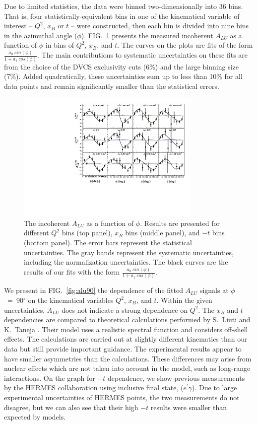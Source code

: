 \documentclass[twocolumn,nofootinbib,showpacs,prl,superscriptaddress,secnumarabic,amssymb,nobibnotes,aps,floatfix]{revtex4}
\begin{document}
Due to limited statistics, the data were binned two-dimensionally into 36 bins.  
That is, four statistically-equivalent bins in one of the kinematical 
variable of interest -- $Q^{2}$, $x_{B}$ or $t$ -- were constructed, then each 
bin is divided into nine bins in the azimuthal angle ($\phi$).  
FIG.~\ref{fig:alu} presents the measured incoherent $A_{LU}$ as a function of 
$\phi$ in bins of $Q^{2}$, $x_{B}$, and $t$. The curves on the plots are fits 
of the form $\frac{a_{0}~sin(\phi)}{1+ a_{1}~cos(\phi)}$. The main contributions 
to systematic uncertainties on these fits are from the choice of the DVCS 
exclusivity cuts (6\%) and the large binning size (7\%). Added quadratically, 
these uncertainties sum up to less than 10\% for all data points and remain 
significantly smaller than the statistical errors.

\begin{figure}[tb]
\includegraphics[width=8.9cm]{figs/incoherent_ALU_phi.pdf}
\caption{The incoherent $A_{LU}$ as a function of $\phi$. Results are presented
   for different $Q^{2}$ bins (top panel), $x_{B}$ bins (middle panel), and 
   $-t$ bins (bottom panel). The error bars represent the statistical 
   uncertainties. The gray bands represent the systematic uncertainties, 
   including the normalization uncertainties. The black curves are the results 
   of our fits with the form $\frac{a_{0}~sin(\phi)}{1+ a_{1}~cos(\phi)}$.}
\label{fig:alu}
\end{figure}


We present in FIG.~\ref{fig:alu90} the dependence of the fitted $A_{LU}$ 
signals at $\phi$~=~90$^{\circ}$ on the kinematical variables $Q^2$, $x_{B}$, 
and $t$. Within the given uncertainties, $A_{LU}$ does not indicate a strong 
dependence on $Q^2$. The $x_{B}$ and $t$ dependencies are compared to 
theoretical calculations performed by S.~Liuti and K.~Taneja 
\cite{simonetta_2}. Their model uses a realistic spectral function and 
considers off-shell effects. The calculations are carried out at slightly 
different kinematics than our data but still provide important guidance. The 
experimental results appear to have smaller asymmetries than the calculations.  
These differences may arise from nuclear effects which are not taken into 
account in the model, such as long-range interactions. On the graph for $-t$ 
dependence, we show previous measurements by the HERMES collaboration
\cite{Airapetian:2009cga} using inclusive final state, ($e^\prime\gamma$). Due 
to large experimental uncertainties of HERMES points, the two measurements 
do not disagree, but we can also see that their high $-t$ results were 
smaller than expected by models. 
\end{document}

